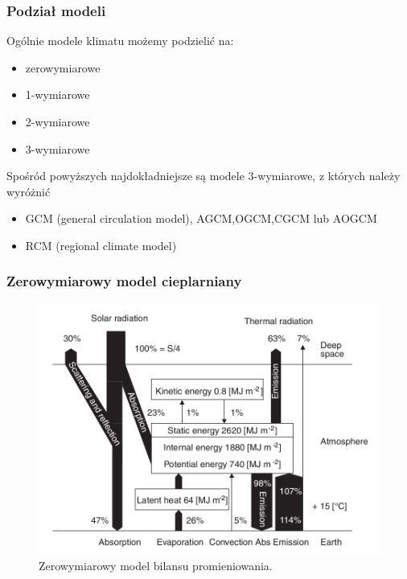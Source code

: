 \documentclass{beamer}
\begin{document}
\begin{frame}
	\frametitle{Podział modeli}
	Ogólnie modele klimatu możemy podzielić na:
	\begin{itemize}
		\item zerowymiarowe
		\item 1-wymiarowe
		\item 2-wymiarowe
		\item 3-wymiarowe
	\end{itemize}
	\vspace{0.5cm}
	Spośród powyższych najdokładniejsze są modele 3-wymiarowe, z których należy wyróżnić
	\begin{itemize}
		\item GCM (general circulation model), AGCM,OGCM,CGCM lub AOGCM
		\item RCM (regional climate model)
	\end{itemize}
	
\end{frame}



\begin{frame}
	\frametitle{Zerowymiarowy model cieplarniany}
	\begin{figure}[h]
		\begin{center}
			\includegraphics[width=0.7\linewidth]{images/0D_Model.png}
			\caption{Zerowymiarowy model bilansu promieniowania.\cite{b2}}
		\end{center}
	\end{figure}

\end{frame}
\end{document}
